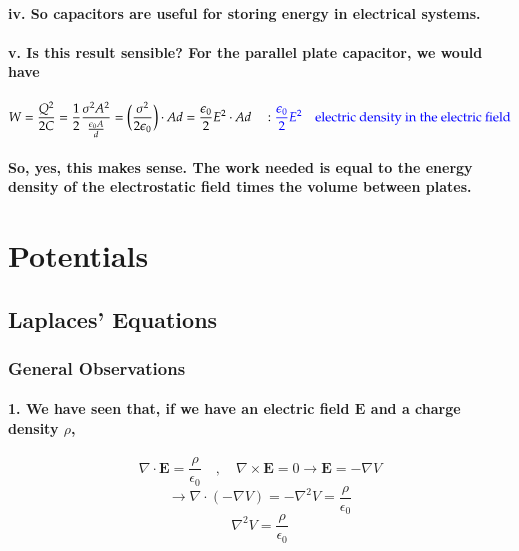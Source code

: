 \documentclass{article}
\begin{document}
\paragraph{\indent iv. So capacitors are useful for storing energy in electrical systems.}
\paragraph{\indent v. Is this result sensible? For the parallel plate capacitor, we would have}
\begin{equation*}
    W=\frac{Q^2}{2C}=\frac{1}{2}\frac{\sigma^2A^2}{\frac{\epsilon_0A}{d}}=\bigg(\frac{\sigma^2}{2\epsilon_0}\bigg)\cdot Ad=\frac{\epsilon_0}{2}E^2\cdot Ad\quad: \textcolor{blue}{\frac{\epsilon_0}{2}E^2}\quad\textcolor{blue}{\text{electric density in the electric field}}
\end{equation*}
\paragraph{So, yes, this makes sense. The work needed is equal to the energy density of the electrostatic field times the volume between plates.}
\section{Potentials}
\subsection{Laplaces' Equations}
\subsubsection{General Observations}
\paragraph{1. We have seen that, if we have an electric field $\boldsymbol{E}$ and a charge density $\rho$,}
\begin{equation*}
    \nabla \cdot \boldsymbol{E}=\frac{\rho}{\epsilon_0}\quad,\quad \nabla \times \boldsymbol{E}=0 \longrightarrow \boldsymbol{E}=-\nabla V
\end{equation*}
\begin{equation*}
    \longrightarrow \nabla\cdot (-\nabla V)=-\nabla^2V=\frac{\rho}{\epsilon_0}
\end{equation*}
\begin{equation*}
    \nabla^2V=\frac{\rho}{\epsilon_0}
\end{equation*}
\end{document}
